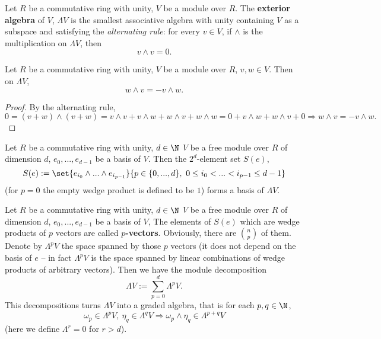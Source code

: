 \begin{definition}
  Let
    $R$ be a commutative ring with unity,
    $V$ be a module over $R$.
  The \textbf{exterior algebra} of $V$, $\Lambda V$ is the smallest associative
  algebra with unity containing $V$ as a subspace and satisfying the
  \textit{alternating rule}:
  for every $v \in V$, if $\wedge$ is the multiplication on $\Lambda V$, then
  \begin{equation}
    v \wedge v = 0.
  \end{equation}
\end{definition}
\begin{proposition}
  Let
    $R$ be a commutative ring with unity,
    $V$ be a module over $R$,
    $v, w \in V$.
  Then on $\Lambda V$,
  \begin{equation}
    w \wedge v = - v \wedge w.
  \end{equation}
\end{proposition}
\begin{proof}
  By the alternating rule,
  \begin{equation}
    0 = (v + w) \wedge (v + w)
    = v \wedge v + v \wedge w + w \wedge v + w \wedge w
    = 0 + v \wedge w + w \wedge v + 0
    \Rightarrow w \wedge v = - v \wedge w.
  \end{equation}
\end{proof}
\begin{proposition}
  Let
    $R$ be a commutative ring with unity,
    $d \in \N$
    $V$ be a free module over $R$ of dimension $d$,
    $e_0, ..., e_{d - 1}$ be a basis of $V$.
  Then the $2^d$-element set $S(e)$,
  \begin{equation}
    S(e) :=
    \set{e_{i_0} \wedge ... \wedge e_{i_{p - 1}}}
    {p \in \{0, ..., d\},\ 0 \leq i_0 < ... < i_{p - 1} \leq d - 1}
  \end{equation}
  (for $p = 0$ the empty wedge product is defined to be $1$)
  forms a basis of $\Lambda V$.
\end{proposition}
\begin{remark}
   Let
    $R$ be a commutative ring with unity,
    $d \in \N$
    $V$ be a free module over $R$ of dimension $d$,
    $e_0, ..., e_{d - 1}$ be a basis of $V$,
  The elements of $S(e)$ which are wedge products of $p$ vectors are called
  \textbf{$p$-vectors}.
  Obviously, there are $\binom{n}{p}$ of them.
  Denote by $\Lambda^p V$ the space spanned by those $p$ vectors
  (it does not depend on the basis of $e$ -- in fact $\Lambda^p V$ is the space
  spanned by linear combinations of wedge products of arbitrary vectors).
  Then we have the module decomposition
  \begin{equation}
    \Lambda V := \sum_{p = 0}^d \Lambda^p V.
  \end{equation}
  This decompositions turns $\Lambda V$ into a graded algebra, that is for each
  $p, q \in \N$,
  \begin{equation}
    \omega_p \in \Lambda^p V,\ \eta_q \in \Lambda^q V
    \Rightarrow \omega_p \wedge \eta_q \in \Lambda^{p + q} V
  \end{equation}
  (here we define $\Lambda^r = 0$ for $r > d$).
\end{remark}
